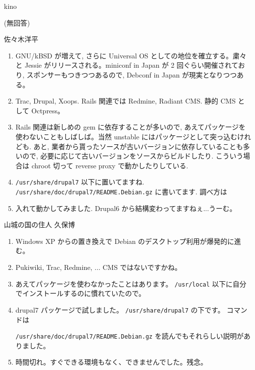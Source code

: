 \documentclass[mingoth,a4paper]{jsarticle}
\begin{document}
\begin{prework}{ kino }

(無回答)

\end{prework}

\begin{prework}{ 佐々木洋平 }
  \begin{enumerate}
  \item GNU/k\*BSD が増えて, さらに Universal OS としての地位を確立する。粛々と Jessie がリリースされる。miniconf in Japan が 2 回ぐらい開催されており, スポンサーもつきつつあるので, Debconf in Japan が現実となりつつある。
  \item Trac, Drupal, Xoops. Rails 関連では Redmine, Radiant CMS. 静的 CMS として Octpress。
  \item Rails 関連は新しめの gem に依存することが多いので, あえてパッケージを使わないこともしばしば。当然 unstable にはパッケージとして突っ込むけれども. あと, 業者から貰ったソースが古いバージョンに依存していることも多いので, 必要に応じて古いバージョンをソースからビルドしたり. こういう場合は chroot 切って reverse proxy で動かしたりしている.
  \item {\tt /usr/share/drupal7} 以下に置いてますね. {\tt /usr/share/doc/drupal7/README.Debian.gz} に書いてます. 調べ方は
  \item 入れて動かしてみました. Drupal6 から結構変わってますねぇ...うーむ。
  \end{enumerate}
\end{prework}

\begin{prework}{ 山城の国の住人 久保博 }
  \begin{enumerate}
  \item Windows XP からの置き換えで Debian のデスクトップ利用が爆発的に進む。
  \item Pukiwiki, Trac, Redmine, ... CMS ではないですかね。
  \item あえてパッケージを使わなかったことはあります。 {\tt /usr/local} 以下に自分でインストールするのに慣れていたので。
  \item drupal7 パッケージで試しました。 {\tt /usr/share/drupal7} の下です。
    コマンドは
    \begin{commandline}
    \end{commandline}
    {\tt /usr/share/doc/drupal7/README.Debian.gz} を読んでもそれらしい説明がありました。
  \item 時間切れ。すぐできる環境もなく、できませんでした。残念。
  \end{enumerate}
\end{prework}
\end{document}
